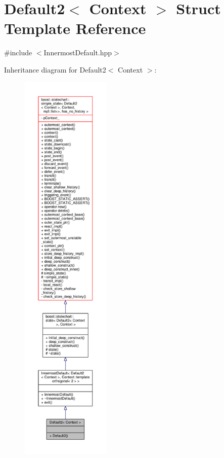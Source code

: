 \hypertarget{struct_default2}{}\section{Default2$<$ Context $>$ Struct Template Reference}
\label{struct_default2}


{\ttfamily \#include $<$Innermost\+Default.\+hpp$>$}



Inheritance diagram for Default2$<$ Context $>$\+:
\nopagebreak
\begin{figure}[H]
\begin{center}
\leavevmode
\includegraphics[height=550pt]{struct_default2__inherit__graph}
\end{center}
\end{figure}


